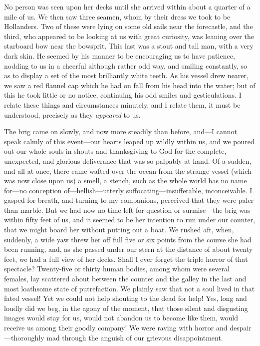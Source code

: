 No person was seen upon her decks until she arrived within about a quarter of
a mile of us. We then saw three seamen, whom by their dress we took to be
Hollanders. Two of these were lying on some old sails near the forecastle, and
the third, who appeared to be looking at us with great curiosity, was leaning
over the starboard bow near the bowsprit. This last was a stout and tall man,
with a very dark skin. He seemed by his manner to be encouraging us to have
patience, nodding to us in a cheerful although rather odd way, and smiling
constantly, so as to display a set of the most brilliantly white teeth. As his
vessel drew nearer, we saw a red flannel cap which he had on fall from his head
into the water; but of this he took little or no notice, continuing his odd
smiles and gesticulations. I relate these things and circumstances minutely, and
I relate them, it must be understood, precisely as they \emph{appeared} to
us. 

The brig came on slowly, and now more steadily than before, and---I cannot
speak calmly of this event---our hearts leaped up wildly within us, and we
poured out our whole souls in shouts and thanksgiving to God for the complete,
unexpected, and glorious deliverance that was so palpably at hand. Of a sudden,
and all at once, there came wafted over the ocean from the strange vessel (which
was now close upon us) a smell, a stench, such as the whole world has no name
for---no conception of---hellish---utterly suffocating---insufferable,
inconceivable. I gasped for breath, and turning to my companions, perceived that
they were paler than marble. But we had now no time left for question or
surmise---the brig was within fifty feet of us, and it seemed to be her
intention to run under our counter, that we might board her without putting out
a boat. We rushed aft, when, suddenly, a wide yaw threw her off full five or six
points from the course she had been running, and, as she passed under our stern
at the distance of about twenty feet, we had a full view of her decks. Shall I
ever forget the triple horror of that spectacle? Twenty-five or thirty human
bodies, among whom were several females, lay scattered about between the counter
and the galley in the last and most loathsome state of putrefaction. We plainly
saw that not a soul lived in that fated vessel! Yet we could not help shouting
to the dead for help! Yes, long and loudly did we beg, in the agony of the
moment, that those silent and disgusting images would stay for us, would not
abandon us to become like them, would receive us among their goodly company! We
were raving with horror and despair---thoroughly mad through the anguish of our
grievous disappointment. 

